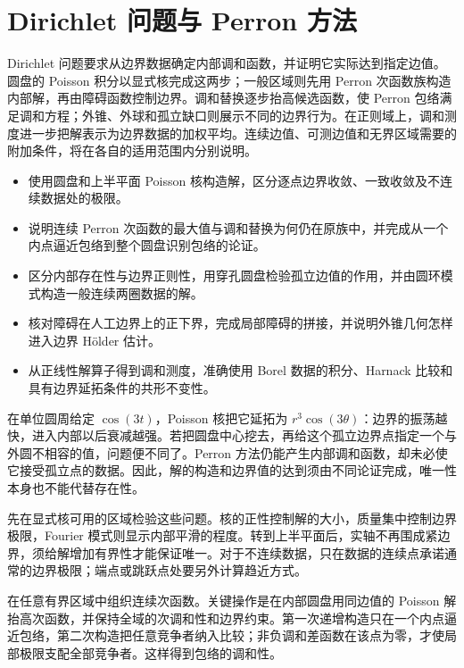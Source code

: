\chapter{Dirichlet 问题与 Perron 方法}
\label{b3:ch:16}
\begin{chapterabstract}
Dirichlet 问题要求从边界数据确定内部调和函数，并证明它实际达到指定边值。圆盘的 Poisson 积分以显式核完成这两步；一般区域则先用 Perron 次函数族构造内部解，再由障碍函数控制边界。调和替换逐步抬高候选函数，使 Perron 包络满足调和方程；外锥、外球和孤立缺口则展示不同的边界行为。在正则域上，调和测度进一步把解表示为边界数据的加权平均。连续边值、可测边值和无界区域需要的附加条件，将在各自的适用范围内分别说明。
\end{chapterabstract}

\begin{learninggoals}
\begin{itemize}
\item 使用圆盘和上半平面 Poisson 核构造解，区分逐点边界收敛、一致收敛及不连续数据处的极限。
\item 说明连续 Perron 次函数的最大值与调和替换为何仍在原族中，并完成从一个内点逼近包络到整个圆盘识别包络的论证。
\item 区分内部存在性与边界正则性，用穿孔圆盘检验孤立边值的作用，并由圆环模式构造一般连续两圈数据的解。
\item 核对障碍在人工边界上的正下界，完成局部障碍的拼接，并说明外锥几何怎样进入边界 Hölder 估计。
\item 从正线性解算子得到调和测度，准确使用 Borel 数据的积分、Harnack 比较和具有边界延拓条件的共形不变性。
\end{itemize}
\end{learninggoals}

在单位圆周给定 \(\cos(3t)\)，Poisson 核把它延拓为 \(r^3\cos(3\theta)\)：边界的振荡越快，进入内部以后衰减越强。若把圆盘中心挖去，再给这个孤立边界点指定一个与外圆不相容的值，问题便不同了。Perron 方法仍能产生内部调和函数，却未必使它接受孤立点的数据。因此，解的构造和边界值的达到须由不同论证完成，唯一性本身也不能代替存在性。

\ProseParagraphBreak
{}先在显式核可用的区域检验这些问题。核的正性控制解的大小，质量集中控制边界极限，Fourier 模式则显示内部平滑的程度。转到上半平面后，实轴不再围成紧边界，须给解增加有界性才能保证唯一。对于不连续数据，只在数据的连续点承诺通常的边界极限；端点或跳跃点处要另外计算趋近方式。

\ProseParagraphBreak
{}在任意有界区域中组织连续次函数。关键操作是在内部圆盘用同边值的 Poisson 解抬高次函数，并保持全域的次调和性和边界约束。第一次递增构造只在一个内点逼近包络，第二次构造把任意竞争者纳入比较；非负调和差函数在该点为零，才使局部极限支配全部竞争者。这样得到包络的调和性。

